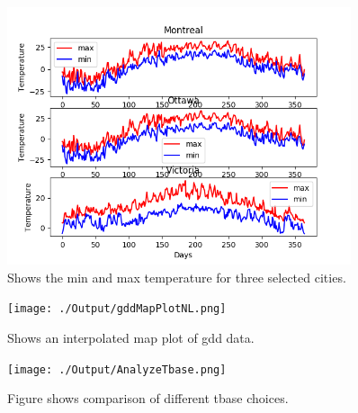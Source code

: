 \documentclass[12pt]{article}
\begin{document}
	\begin{figure}[!htbp]
		\centering
		\includegraphics[width=0.9\textwidth]{./Output/CompareMaxMinTemp.png} 
		\caption{\scriptsize Shows the min and max temperature for three selected cities.}\label{MinMaxplot}		  
	\end{figure}

	\begin{figure}[!htbp]
		\centering
		\texttt{[image: ./Output/gddMapPlotNL.png]} 
		\caption{\scriptsize Shows an interpolated map plot of gdd data.}\label{gddMapNl}		  
	\end{figure}

	\begin{figure}[!htbp]
		\centering
		\texttt{[image: ./Output/AnalyzeTbase.png]} 
		\caption{\scriptsize Figure shows comparison of different tbase choices.}\label{gddMapNl}		  
	\end{figure}
\end{document}
